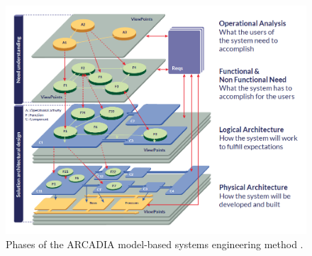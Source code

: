 \documentclass[conference]{IEEEtran}
\begin{document}

\begin{figure}[t]
    \centering
    \includegraphics[width=\linewidth]{phases_arcadia.png}
    \caption{Phases of the ARCADIA model-based systems engineering method \cite{Arcadia_phases}.}
    \label{fig:phases_arcadia}
\end{figure}
\end{document}
